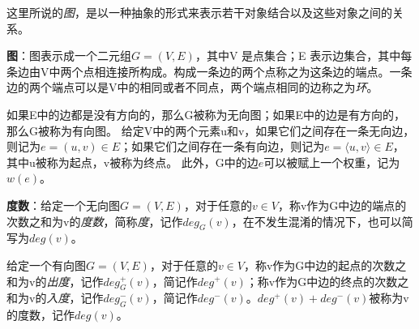 这里所说的\emph{图}，是以一种抽象的形式来表示若干对象结合以及这些对象之间的关系。


\begin{definition}
\label{def:graph}
\textbf{图}：图表示成一个二元组$G=(V,E)$，其中V 是点集合；E 表示边集合，其中每条边由V中两个点相连接所构成。构成一条边的两个点称之为这条边的端点。一条边的两个端点可以是V中的相同或者不同点，两个端点相同的边称之为\emph{环}。
\end{definition}

如果E中的边都是没有方向的，那么G被称为无向图；如果E中的边是有方向的，那么G被称为有向图。
给定V中的两个元素u和v，如果它们之间存在一条无向边，则记为$e=(u,v)\in E$；如果它们之间存在一条有向边，则记为$e=\langle u,v\rangle \in E$，其中u被称为起点，v被称为终点。
此外，G中的边$e$可以被赋上一个权重，记为$w(e)$。

\begin{definition}
\label{def:graph_degree}
\textbf{度数}：给定一个无向图$G=(V,E)$，对于任意的$v\in V$，称v作为G中边的端点的次数之和为v的\emph{度数}，简称\emph{度}，记作$deg_G(v)$，在不发生混淆的情况下，也可以简写为$deg(v)$。

给定一个有向图$G=(V,E)$，对于任意的$v\in V$，称v作为G中边的起点的次数之和为v的\emph{出度}，记作$deg_G^+(v)$，简记作$deg^+(v)$；称v作为G中边的终点的次数之和为v的\emph{入度}，记作$deg_G^-(v)$，简记作$deg^-(v)$。$deg^+(v)+deg^-(v)$被称为v的度数，记作$deg(v)$。
\end{definition}

